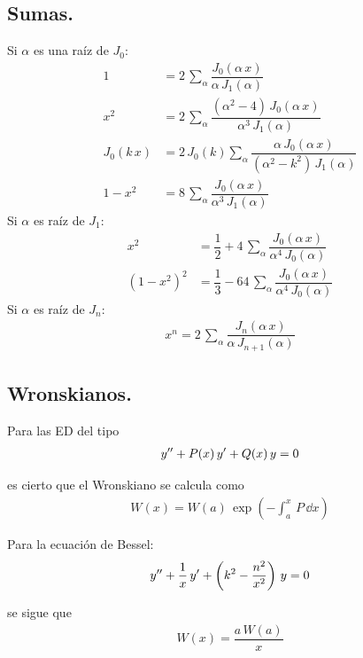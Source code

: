 \subsection{Sumas.}
Si $\alpha$ es una raíz de $J_{0}$:
\begin{align*}
1 &= 2 \, \sum_{\alpha} \dfrac{J_{0} (\alpha \, x)}{\alpha \, J_{1} (\alpha)} \\[0.5em]
x^{2} &= 2 \, \sum_{\alpha} \dfrac{(\alpha^{2}- 4) \, J_{0} (\alpha \, x)}{\alpha^{3} \, J_{1} (\alpha)} \\[0.5em]
J_{0} (k \, x) &= 2 \, J_{0} (k) \sum_{\alpha} \dfrac{\alpha \, J_{0} (\alpha \, x)}{(\alpha^{2} - k^{2}) \, J_{1}(\alpha)} \\[0.5em]
1 -x^{2} &= 8 \, \sum_{\alpha} \dfrac{J_{0}(\alpha \, x)}{\alpha^{3} \, J_{1} (\alpha)}
\end{align*}
Si $\alpha$ es raíz de $J_{1}$:
\begin{align*}
x^{2} &= \dfrac{1}{2} + 4 \, \sum_{\alpha} \dfrac{J_{0} (\alpha \, x)}{\alpha^{4} \, J_{0} (\alpha)} \\[0.5em]
(1 - x^{2})^{2} &= \dfrac{1}{3} - 64 \, \sum_{\alpha} \dfrac{J_{0} (\alpha \, x)}{\alpha^{4} \, J_{0} (\alpha)}
\end{align*}
Si $\alpha$ es raíz de $J_{n}$:
\begin{align*}
x^{n} = 2 \, \sum_{\alpha} \dfrac{J_{n} (\alpha \, x)}{\alpha \, J_{n+1} (\alpha)}
\end{align*}

\subsection{Wronskianos.}

Para las ED del tipo
\begin{align*}
{y}^{\prime \prime} + P(x) \, {y}^{\prime} + Q(x) \, y = 0
\end{align*}

es cierto que el Wronskiano se calcula como
\begin{align*}
W(x) = W(a) \, \exp(- \int_{a}^{x} \, P \, \dd x)
\end{align*}

Para la ecuación de Bessel:
\begin{align*}
{y}^{\prime \prime} + \dfrac{1}{x} \, {y}^{\prime} + \left( k^{2} - \dfrac{n^{2}}{x^{2}} \right) \, y = 0
\end{align*}

se sigue que
\begin{align*}
W(x) = \dfrac{a \, W(a)}{x}
\end{align*}

